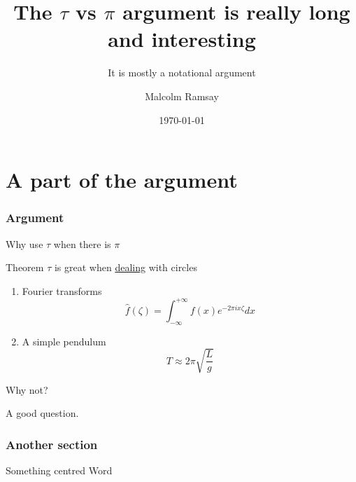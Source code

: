 \documentclass[aspectratio=169, 22pt]{beamer}
\title{The $\tau$ vs $\pi$ argument is really long and interesting}
\subtitle{It is mostly a notational argument}
\date{\today}
\author[Malcolm]{Malcolm Ramsay}
\begin{document}
\titleslide

\part{A part of the argument}
\partslide

\section{Argument}

\begin{plain}{Why use $\tau$ when there is $\pi$}
  \begin{block}{Theorem}
    $\tau$ is great when \href{http://blah}{dealing} with circles
  \end{block}

  \begin{enumerate}
    \item<1-> Fourier transforms
      \begin{equation}
        \hat f(\zeta) = \int_{-\infty}^{+\infty} f(x) e^{-2\pi ix\zeta} dx
      \end{equation}
    \item<2-> A simple pendulum
      \begin{equation}
        T \approx 2\pi \sqrt{\frac{L}{g}}
      \end{equation}
  \end{enumerate}
\end{plain}

\begin{points}{Why not?}
  \item A good question.
\end{points}

\section{Another section}

\begin{centre}{Something centred}
	Word
\end{centre}
\end{document}
